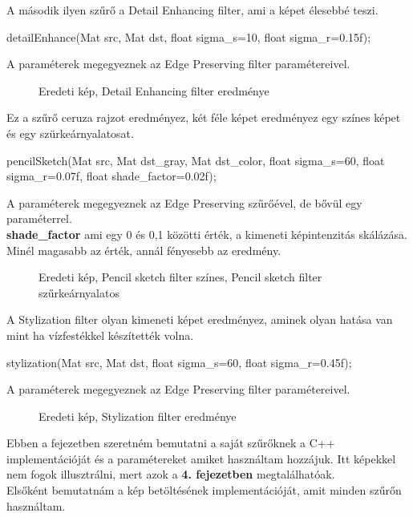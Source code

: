 \newpage
{}
A második ilyen szűrő a Detail Enhancing filter, ami a képet élesebbé teszi.
\begin{cpp}
detailEnhance(Mat src, Mat dst, float sigma_s=10, float sigma_r=0.15f);
\end{cpp}
A paraméterek megegyeznek az Edge Preserving filter paramétereivel. 
 \begin{figure}[ht]
\centering
{}
\caption{Eredeti kép, Detail Enhancing filter eredménye} 
\label{fig:detailEnhance}
\end{figure}
Ez a szűrő ceruza rajzot eredményez, két féle képet eredményez egy színes képet és egy szürkeárnyalatosat.
\begin{cpp}
pencilSketch(Mat src, Mat dst_gray, Mat dst_color, float sigma_s=60, 
		float sigma_r=0.07f, float shade_factor=0.02f);
\end{cpp}
A paraméterek megegyeznek az Edge Preserving szűrőével, de bővül egy paraméterrel.\\
\indent \textbf{shade\_factor}  ami egy 0 és 0,1 közötti érték, a kimeneti képintenzitás skálázása. Minél magasabb az érték, annál fényesebb az eredmény.
\begin{figure}[ht]
\centering
{}
\caption{Eredeti kép, Pencil sketch filter színes, Pencil sketch filter szűrkeárnyalatos} 
\label{fig: pencil_sketch_color_grey}
\end{figure}
A Stylization filter olyan kimeneti képet eredményez, aminek olyan hatása van mint ha vízfestékkel készítették volna.
\begin{cpp}
stylization(Mat src, Mat dst, float sigma_s=60, float sigma_r=0.45f);
\end{cpp}
A paraméterek megegyeznek az Edge Preserving filter paramétereivel. 
 \begin{figure}[ht]
\centering
{}
\caption{Eredeti kép, Stylization filter eredménye} 
\label{fig: stylization}
\end{figure}
Ebben a fejezetben szeretném bemutatni a saját szűrőknek a C++ implementációját és a paramétereket amiket használtam hozzájuk. Itt képekkel nem fogok illusztrálni, mert azok a \textbf{4. fejezetben} megtalálhatóak. \\ Elsőként bemutatnám a kép betöltésének implementációját, amit minden szűrőn használtam.
